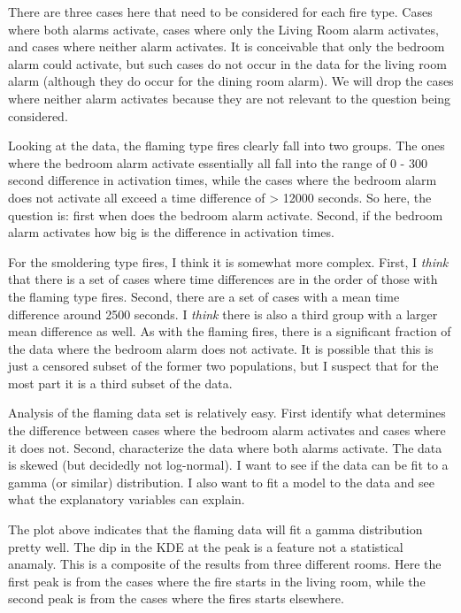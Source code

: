 \documentclass[
]{article}
\begin{document}
There are three cases here that need to be considered for each fire
type. Cases where both alarms activate, cases where only the Living Room
alarm activates, and cases where neither alarm activates. It is
conceivable that only the bedroom alarm could activate, but such cases
do not occur in the data for the living room alarm (although they do
occur for the dining room alarm). We will drop the cases where neither
alarm activates because they are not relevant to the question being
considered.

Looking at the data, the flaming type fires clearly fall into two
groups. The ones where the bedroom alarm activate essentially all fall
into the range of 0 - 300 second difference in activation times, while
the cases where the bedroom alarm does not activate all exceed a time
difference of \textgreater{} 12000 seconds. So here, the question is:
first when does the bedroom alarm activate. Second, if the bedroom alarm
activates how big is the difference in activation times.

For the smoldering type fires, I think it is somewhat more complex.
First, I \emph{think} that there is a set of cases where time
differences are in the order of those with the flaming type fires.
Second, there are a set of cases with a mean time difference around 2500
seconds. I \emph{think} there is also a third group with a larger mean
difference as well. As with the flaming fires, there is a significant
fraction of the data where the bedroom alarm does not activate. It is
possible that this is just a censored subset of the former two
populations, but I suspect that for the most part it is a third subset
of the data.

Analysis of the flaming data set is relatively easy. First identify what
determines the difference between cases where the bedroom alarm
activates and cases where it does not. Second, characterize the data
where both alarms activate. The data is skewed (but decidedly not
log-normal). I want to see if the data can be fit to a gamma (or
similar) distribution. I also want to fit a model to the data and see
what the explanatory variables can explain.

The plot above indicates that the flaming data will fit a gamma
distribution pretty well. The dip in the KDE at the peak is a feature
not a statistical anamaly. This is a composite of the results from three
different rooms. Here the first peak is from the cases where the fire
starts in the living room, while the second peak is from the cases where
the fires starts elsewhere.
\end{document}
